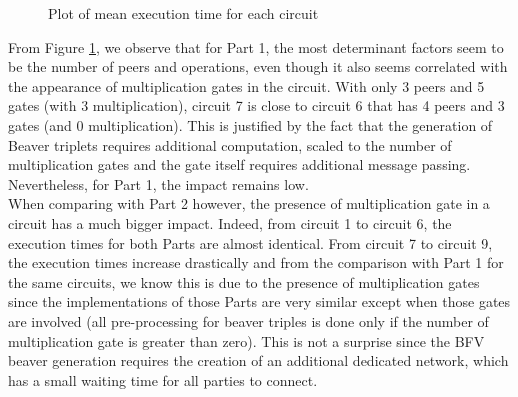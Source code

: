 \documentclass[10pt,conference,compsocconf]{IEEEtran}
\begin{document}
\begin{figure}
    \centering
{}
\caption{Plot of mean execution time for each circuit}
\label{plot}
\end{figure}

From Figure \ref{plot}, we observe that for Part 1, the most determinant factors seem to be the number of peers and operations, even though it also seems correlated with the appearance of multiplication gates in the circuit. With only 3 peers and 5 gates (with 3 multiplication), circuit 7 is close to circuit 6 that has 4 peers and 3 gates (and 0 multiplication). This is justified by the fact that the generation of Beaver triplets requires additional computation, scaled to the number of multiplication gates and the gate itself requires additional message passing. Nevertheless, for Part 1, the impact remains low.\\
When comparing with Part 2 however, the presence of multiplication gate in a circuit has a much bigger impact. Indeed, from circuit 1 to circuit 6, the execution times for both Parts are almost identical. From circuit 7 to circuit 9, the execution times increase drastically and from the comparison with Part 1 for the same circuits, we know this is due to the presence of multiplication gates since the implementations of those Parts are very similar except when those gates are involved (all pre-processing for beaver triples is done only if the number of multiplication gate is greater than zero). This is not a surprise since the BFV beaver generation requires the creation of an additional dedicated network, which has a small waiting time for all parties to connect. \\
\end{document}
